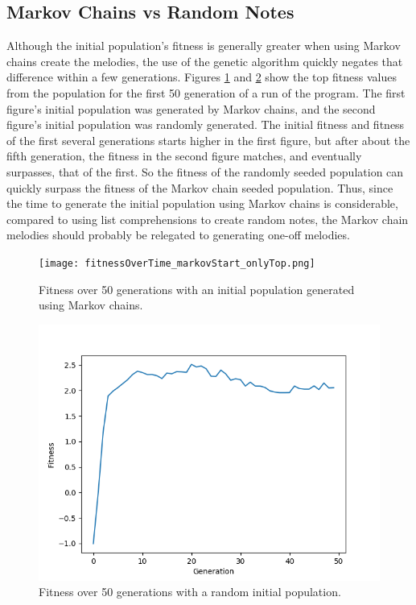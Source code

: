 \subsection{Markov Chains vs Random Notes}
Although the initial population's fitness is generally greater when using Markov chains create the melodies, the use of the genetic algorithm quickly negates that difference within a few generations.
Figures \ref{fig:fitness_markov} and \ref{fig:fitness:random} show the top fitness values from the population for the first 50 generation of a run of the program.
The first figure's initial population was generated by Markov chains, and the second figure's initial population was randomly generated.
The initial fitness and fitness of the first several generations starts higher in the first figure, but after about the fifth generation, the fitness in the second figure matches, and eventually surpasses, that of the first.
So the fitness of the randomly seeded population can quickly surpass the fitness of the Markov chain seeded population.
Thus, since the time to generate the initial population using Markov chains is considerable, compared to using list comprehensions to create random notes, the Markov chain melodies should probably be relegated to generating one-off melodies.

\begin{figure}[h]
	\centering
	\texttt{[image: fitnessOverTime\_markovStart\_onlyTop.png]}
	\caption{Fitness over 50 generations with an initial population generated using Markov chains.}
	\label{fig:fitness_markov}
\end{figure}

\begin{figure}[h]
	\centering
	\includegraphics[width=\linewidth]{figures/fitnessOverTime_randomStart_onlyTop.png}
	\caption{Fitness over 50 generations with a random initial population.}
	\label{fig:fitness:random}
\end{figure}

